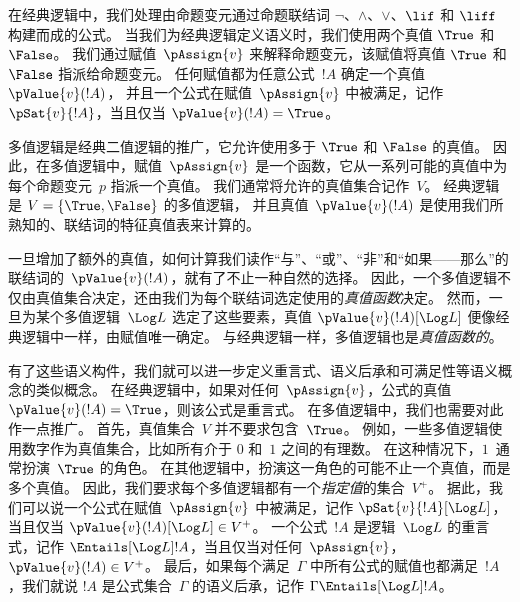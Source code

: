 \documentclass[../../../include/open-logic-section]{subfiles}
\begin{document}


在经典逻辑中，我们处理由命题变元通过命题联结词
$\lnot$、$\land$、$\lor$、$\lif$ 和 $\liff$ 构建而成的公式。
当我们为经典逻辑定义语义时，我们使用两个真值 $\True$ 和 $\False$。
我们通过赋值~$\pAssign{v}$ 来解释命题变元，该赋值将真值 $\True$ 和 $\False$ 指派给命题变元。
任何赋值都为任意公式~$!A$ 确定一个真值 $\pValue{v}(!A)$，
并且一个公式在赋值~$\pAssign{v}$ 中被满足，记作 $\pSat{v}{!A}$，当且仅当 $\pValue{v}(!A) = \True$。

多值逻辑是经典二值逻辑的推广，它允许使用多于 $\True$ 和 $\False$ 的真值。
因此，在多值逻辑中，赋值~$\pAssign{v}$ 是一个函数，它从一系列可能的真值中为每个命题变元~$p$ 指派一个真值。
我们通常将允许的真值集合记作~$V$。
经典逻辑是 $V = \{\True, \False\}$ 的多值逻辑，
并且真值~$\pValue{v}(!A)$ 是使用我们所熟知的、联结词的特征真值表来计算的。

一旦增加了额外的真值，如何计算我们读作“与”、“或”、“非”和“如果——那么”的联结词的~$\pValue{v}(!A)$，就有了不止一种自然的选择。
因此，一个多值逻辑不仅由真值集合决定，还由我们为每个联结词选定使用的\emph{真值函数}决定。
然而，一旦为某个多值逻辑~$\Log L$ 选定了这些要素，真值 $\pValue{v}(!A)[\Log L]$ 便像经典逻辑中一样，由赋值唯一确定。
与经典逻辑一样，多值逻辑也是\emph{真值函数的}。

有了这些语义构件，我们就可以进一步定义重言式、语义后承和可满足性等语义概念的类似概念。
在经典逻辑中，如果对任何~$\pAssign{v}$，公式的真值 $\pValue{v}(!A) = \True$，则该公式是重言式。
在多值逻辑中，我们也需要对此作一点推广。
首先，真值集合~$V$ 并不要求包含~$\True$。
例如，一些多值逻辑使用数字作为真值集合，比如所有介于 $0$ 和~$1$ 之间的有理数。
在这种情况下，$1$~通常扮演~$\True$ 的角色。
在其他逻辑中，扮演这一角色的可能不止一个真值，而是多个真值。
因此，我们要求每个多值逻辑都有一个\emph{指定值}的集合~$V^+$。
据此，我们可以说一个公式在赋值~$\pAssign{v}$ 中被满足，记作 $\pSat{v}{!A}[\Log L]$，当且仅当 $\pValue{v}(!A)[\Log L] \in V^+$。
一个公式~$!A$ 是逻辑~$\Log L$ 的重言式，记作 $\Entails[\Log L] !A$，当且仅当对任何~$\pAssign{v}$，$\pValue{v}(!A) \in V^+$。
最后，如果每个满足~$\Gamma$ 中所有公式的赋值也都满足~$!A$，我们就说 $!A$ 是公式集合~$\Gamma$ 的语义后承，记作 $\Gamma \Entails[\Log L] !A$。
\end{document}
